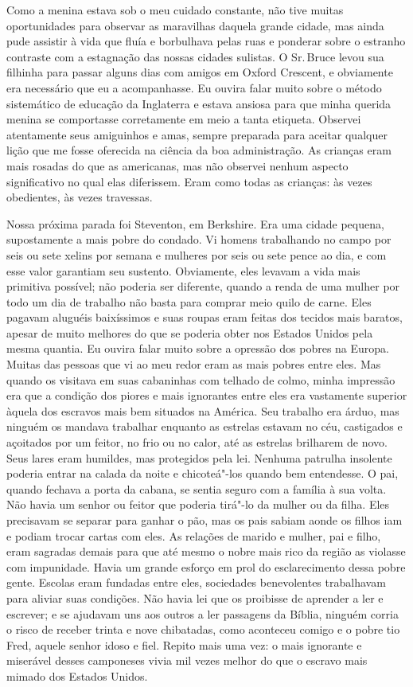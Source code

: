 Como a menina estava sob o meu cuidado
constante, não tive muitas oportunidades para observar as maravilhas
daquela grande cidade, mas ainda pude assistir à vida que fluía e
borbulhava pelas ruas e ponderar sobre o estranho contraste com a
estagnação das nossas cidades sulistas. O Sr.\,Bruce levou sua filhinha
para passar alguns dias com amigos em Oxford Crescent, e obviamente era
necessário que eu a acompanhasse. Eu ouvira falar muito sobre o método
sistemático de educação da Inglaterra e estava ansiosa para que minha
querida menina se comportasse corretamente em meio a tanta etiqueta.
Observei atentamente seus amiguinhos e amas, sempre preparada para
aceitar qualquer lição que me fosse oferecida na ciência da boa
administração. As crianças eram mais rosadas do que as americanas, mas
não observei nenhum aspecto significativo no qual elas diferissem. Eram
como todas as crianças: às vezes obedientes, às vezes travessas.

Nossa próxima parada foi Steventon, em
Berkshire. Era uma cidade pequena, supostamente a mais pobre do condado.
Vi homens trabalhando no campo por seis ou sete xelins por semana e
mulheres por seis ou sete pence ao dia, e com esse valor garantiam seu
sustento. Obviamente, eles levavam a vida mais primitiva possível; não
poderia ser diferente, quando a renda de uma mulher por todo um dia de
trabalho não basta para comprar meio quilo de carne. Eles pagavam
aluguéis baixíssimos e suas roupas eram feitas dos tecidos mais baratos,
apesar de muito melhores do que se poderia obter nos Estados Unidos pela
mesma quantia. Eu ouvira falar muito sobre a opressão dos pobres na
Europa. Muitas das pessoas que vi ao meu redor eram as mais pobres entre
eles. Mas quando os visitava em
suas cabaninhas com telhado de colmo, minha impressão era que a condição
dos piores e mais ignorantes entre eles era vastamente superior àquela
dos escravos mais bem situados na América. Seu trabalho era árduo, mas
ninguém os mandava trabalhar enquanto as estrelas estavam no céu,
castigados e açoitados por um feitor, no frio ou no calor, até as
estrelas brilharem de novo. Seus lares eram humildes, mas protegidos
pela lei. Nenhuma patrulha insolente poderia entrar na calada da noite e
chicoteá"-los quando bem entendesse. O pai, quando fechava a porta da
cabana, se sentia seguro com a família à sua volta. Não havia um senhor
ou feitor que poderia tirá"-lo da mulher ou da filha. Eles precisavam se
separar para ganhar o pão, mas os pais sabiam aonde os filhos iam e
podiam trocar cartas com eles. As relações de marido e mulher, pai e
filho, eram sagradas demais para que até mesmo o nobre mais rico da
região as violasse com impunidade. Havia um grande esforço em prol do
esclarecimento dessa pobre gente. Escolas eram fundadas entre eles,
sociedades benevolentes trabalhavam para aliviar suas condições. Não
havia lei que os proibisse de aprender a ler e escrever; e se ajudavam
uns aos outros a ler passagens da Bíblia, ninguém corria o risco de
receber trinta e nove chibatadas, como aconteceu comigo e o pobre tio
Fred, aquele senhor idoso e fiel.
Repito mais uma vez: o mais
ignorante e miserável desses camponeses vivia mil vezes melhor do que o
escravo mais mimado dos Estados Unidos.


